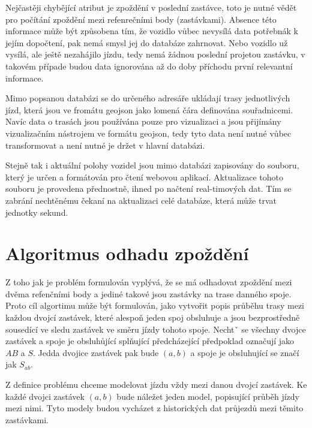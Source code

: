 \bigbreak

Nejčastěji chybějící atribut je zpoždění v poslední zastávce, toto je nutné vědět pro počítání zpoždění mezi refenrečními body (zastávkami). Absence této informace může být způsobena tím, že vozidlo vůbec nevysílá data potřebnák k jejím dopočtení, pak nemá smysl jej do databáze zahrnovat. Nebo vozidlo už vysílá, ale ještě nezahájilo jízdu, tedy nemá žádnou poslední projetou zastávku, v takovém případe budou data ignorována až do doby příchodu první relevantní informace.

\bigbreak

Mimo popsanou databázi se do určeného adresáře ukládají trasy jednotlivých jízd, která jsou ve fromátu \gls{geojson} jako lomená čára definována souřadnicemi. Navíc data o trasách jsou používána pouze pro vizualizaci a jsou přijímány vizualizačním nástrojem ve formátu \gls{geojson}, tedy tyto data není nutné vůbec transformovat a není nutné je držet v hlavní databázi.

\bigbreak

 Stejně tak i aktuální polohy vozidel jsou mimo databázi zapisovány do souboru, který je určen a formátován pro čtení webovou aplikací. Aktualizace tohoto souboru je provedena přednostně, ihned po načtení real-timových dat. Tím se zabrání nechtěnému čekaní na aktualizaci celé databáze, která může trvat jednotky sekund.









\section{Algoritmus odhadu zpoždění}

Z toho jak je problém formulován vyplývá, že se má odhadovat zpoždění mezi dvěma refenčními body a jediné takové jsou zastávky na trase danného spoje. Proto cíl algortimu může být formulován, jako vytvořit popis průběhu trasy mezi každou dvojcí zastávek, které alespoň jeden spoj obsluhuje a jsou bezprostředně sousedící ve sledu zastávek ve směru jízdy tohoto spoje. Nechtˇ se všechny dvojce zastávek a spoje je obsluhůjící splňující předcházející předpoklad označují jako $AB$ a $S$. Jedda dvojice zastávek pak bude $(a, b)$ a spoje je obsluhující se značí jak $S_{ab}$.

\bigbreak

Z definice problému chceme modelovat jízdu vždy mezi danou dvojcí zastávek. Ke každé dvojci zastávek $(a, b)$ bude náležet jeden model, popisující průběh jízdy mezi nimi. Tyto modely budou vycházet z historických dat průjezdů mezi těmito zastávkami.

